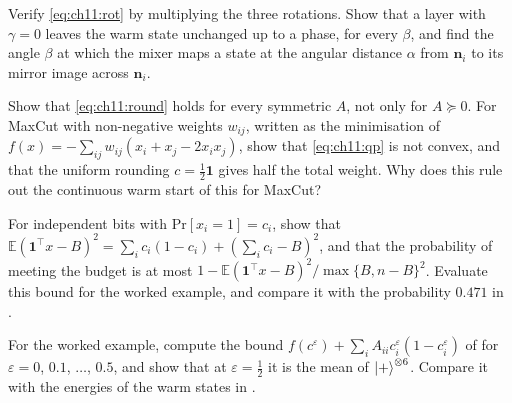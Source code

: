 \documentclass[handoutsbeamer.tex]{subfiles}
\begin{document}

\begin{frame}
\onp{\footnotesize}
\begin{exe}\label{exe:ch11:mixer}
Verify \eqref{eq:ch11:rot} by multiplying the three rotations. Show that a layer with $\gamma = 0$ leaves the warm state unchanged up to a phase, for every $\beta$, and find the angle $\beta$ at which the mixer maps a state at the angular distance $\alpha$ from $\boldsymbol n_i$ to its mirror image across $\boldsymbol n_i$.
\end{exe}
\begin{exe}\label{exe:ch11:round}
Show that \eqref{eq:ch11:round} holds for every symmetric $A$, not only for $A\succeq0$. For MaxCut with non-negative weights $w_{ij}$, written as the minimisation of $f(x) = -\sum_{ij}w_{ij}(x_i+x_j-2x_ix_j)$, show that \eqref{eq:ch11:qp} is not convex, and that the uniform rounding $c = \frac12\boldsymbol1$ gives half the total weight. Why does this rule out the continuous warm start of this \chap{} for MaxCut?
\end{exe}
\end{frame}

\begin{frame}
\onp{\footnotesize}
\begin{exe}\label{exe:ch11:budget}
For independent bits with $\mathrm{Pr}[x_i = 1] = c_i$, show that $\mathbb E(\boldsymbol1^\top x-B)^2 = \sum_ic_i(1-c_i)+(\sum_ic_i-B)^2$, and that the probability of meeting the budget is at most $1-\mathbb E(\boldsymbol1^\top x-B)^2/\max\{B,n-B\}^2$. Evaluate this bound for the worked example, and compare it with the probability $0.471$ in .
\end{exe}
\begin{exe}[Regularisation]\label{exe:ch11:eps}
For the worked example, compute the bound $f(c^\varepsilon)+\sum_iA_{ii}c_i^\varepsilon(1-c_i^\varepsilon)$ of  for $\varepsilon = 0$, $0.1$, $\dots$, $0.5$, and show that at $\varepsilon = \frac12$ it is the mean of $\ket+^{\otimes6}$. Compare it with the energies of the warm states in .
\end{exe}
\end{frame}

\begin{frame}[allowframebreaks]
\biblio
\end{frame}
\end{document}
